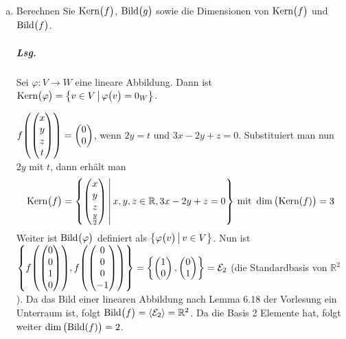 \documentclass{scrreprt}
\newcommand\Bild{\text{Bild}}
\newcommand\Kern{\text{Kern}}
\newcommand\hull[1]{\left\langle #1 \right\rangle}
\begin{document}
\begin{enumerate}[(a)]
\item Berechnen Sie $\Kern\qty\big(f)$, $\Bild\qty\big(g)$ sowie die Dimensionen
  von $\Kern\qty\big(f)$ und $\Bild\qty\big(f)$.
  \subparagraph{Lsg.} Sei $\varphi \colon V \to W$ eine lineare Abbildung.
  Dann ist $\Kern\qty\big(\varphi) =
  \qty\big{v \in V \,{\big |}\, \varphi\qty\big(v) = 0_W}$.

  $f\qty(\begin{pmatrix} x \\ y \\ z \\ t\end{pmatrix}) =
  \begin{pmatrix} 0 \\ 0 \end{pmatrix}$, wenn $2y = t$ und
  $3x - 2y + z = 0$.
  Substituiert man nun $2y$ mit $t$, dann erhält man
  \[
    \Kern\qty\big(f) = \qty{
      \begin{pmatrix}
        x \\
        y \\
        z \\
        \frac{y}{2}
      \end{pmatrix} \,\middle|\,
      x, y, z \in \mathbb{R}, 3x - 2y + z = 0
    } \text{ mit } \dim\qty\big(\Kern(f)) = 3
  \]
  Weiter ist $\Bild\qty\big(\varphi)$ definiert als
  $\qty\big{\varphi\qty\big(v) \,{\big|}\, v \in V}$.
  Nun ist $\qty{
    f\qty(\begin{pmatrix} 0 \\ 0 \\ 1 \\ 0\end{pmatrix}),
    f\qty(\begin{pmatrix} 0 \\ 0 \\ 0 \\ -1\end{pmatrix})
  } = \qty{
    \begin{pmatrix} 1 \\ 0 \end{pmatrix},
    \begin{pmatrix} 0 \\ 1 \end{pmatrix}
  } = \mathcal{E}_2$ (die Standardbasis von $\mathbb{R}^2$).
  Da das Bild einer linearen Abbildung nach Lemma 6.18 der Vorlesung
  ein Unterraum ist, folgt
  $\Bild\qty\big(f) = \hull{\mathcal{E}_2} = \mathbb{R}^2$.
  Da die Basis 2 Elemente hat, folgt weiter $\dim\qty\big(\Bild(f)) = 2$.


\end{enumerate}
\end{document}
